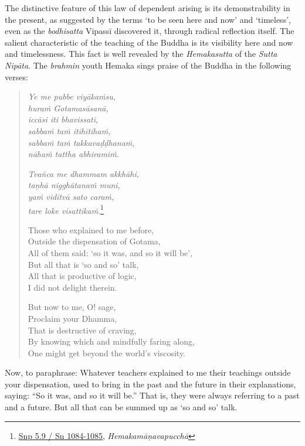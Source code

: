 The distinctive feature of this law of dependent arising is its demonstrability in the present, as suggested by the terms `to be seen here and now' and `timeless', even as the \emph{bodhisatta} Vipassī discovered it, through radical reflection itself. The salient characteristic of the teaching of the Buddha is its visibility here and now and timelessness. This fact is well revealed by the \emph{Hemakasutta} of the \emph{Sutta Nipāta}. The \emph{brahmin} youth Hemaka sings praise of the Buddha in the following verses:

\begin{quote}
\emph{Ye me pubbe viyākaṁsu,}\\
\emph{huraṁ Gotamasāsanā,}\\
\emph{iccāsi iti bhavissati,}\\
\emph{sabbaṁ taṁ itihītihaṁ,}\\
\emph{sabbaṁ taṁ takkavaḍḍhanaṁ,}\\
\emph{nāhaṁ tattha abhiramiṁ.}

\emph{Tvañca me dhammam akkhāhi,}\\
\emph{taṇhā nigghātanaṁ muni,}\\
\emph{yaṁ viditvā sato caraṁ,}\\
\emph{tare loke visattikaṁ}.\footnote{\href{https://suttacentral.net/snp5.9/pli/ms}{Snp 5.9 / Sn 1084-1085}, \emph{Hemakamāṇavapucchā}}

Those who explained to me before,\\
Outside the dispensation of Gotama,\\
All of them said: `so it was, and so it will be',\\
But all that is `so and so' talk,\\
All that is productive of logic,\\
I did not delight therein.

But now to me, O! sage,\\
Proclaim your Dhamma,\\
That is destructive of craving,\\
By knowing which and mindfully faring along,\\
One might get beyond the world's viscosity.
\end{quote}

Now, to paraphrase: Whatever teachers explained to me their teachings outside your dispensation, used to bring in the past and the future in their explanations, saying: ``So it was, and so it will be.'' That is, they were always referring to a past and a future. But all that can be summed up as `so and so' talk.

